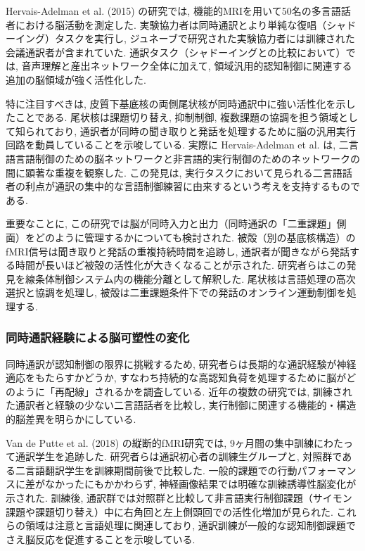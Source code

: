 Hervais-Adelman et al. (2015) \cite{hervais2015fmri}の研究では, 機能的MRIを用いて50名の多言語話者における脳活動を測定した. 
実験協力者は同時通訳とより単純な復唱（シャドーイング）タスクを実行し, ジュネーブで研究された実験協力者には訓練された会議通訳者が含まれていた. 
通訳タスク（シャドーイングとの比較において）では, 音声理解と産出ネットワーク全体に加えて, 領域汎用的認知制御に関連する追加の脳領域が強く活性化した.

特に注目すべきは, 皮質下基底核の両側尾状核が同時通訳中に強い活性化を示したことである. 
尾状核は課題切り替え, 抑制制御, 複数課題の協調を担う領域として知られており, 通訳者が同時の聞き取りと発話を処理するために脳の汎用実行回路を動員していることを示唆している.
実際に Hervais-Adelman et al. は, 二言語言語制御のための脳ネットワークと非言語的実行制御のためのネットワークの間に顕著な重複を観察した. 
この発見は, 実行タスクにおいて見られる二言語話者の利点が通訳の集中的な言語制御練習に由来するという考えを支持するものである.

重要なことに, この研究では脳が同時入力と出力（同時通訳の「二重課題」側面）をどのように管理するかについても検討された. 
被殻（別の基底核構造）のfMRI信号は聞き取りと発話の重複持続時間を追跡し, 通訳者が聞きながら発話する時間が長いほど被殻の活性化が大きくなることが示された.
研究者らはこの発見を線条体制御システム内の機能分離として解釈した. 尾状核は言語処理の高次選択と協調を処理し, 被殻は二重課題条件下での発話のオンライン運動制御を処理する. 

\subsubsection{同時通訳経験による脳可塑性の変化}

同時通訳が認知制御の限界に挑戦するため, 研究者らは長期的な通訳経験が神経適応をもたらすかどうか, すなわち持続的な高認知負荷を処理するために脳がどのように「再配線」されるかを調査している.
近年の複数の研究では, 訓練された通訳者と経験の少ない二言語話者を比較し, 実行制御に関連する機能的・構造的脳差異を明らかにしている.

Van de Putte et al. (2018) \cite{vandeputte2018anatomical}の縦断的fMRI研究では, 9ヶ月間の集中訓練にわたって通訳学生を追跡した.
研究者らは通訳初心者の訓練生グループと, 対照群である二言語翻訳学生を訓練期間前後で比較した.
一般的課題での行動パフォーマンスに差がなかったにもかかわらず, 神経画像結果では明確な訓練誘導性脳変化が示された.
訓練後, 通訳群では対照群と比較して非言語実行制御課題（サイモン課題や課題切り替え）中に右角回と左上側頭回での活性化増加が見られた.
これらの領域は注意と言語処理に関連しており, 通訳訓練が一般的な認知制御課題でさえ脳反応を促進することを示唆している.

